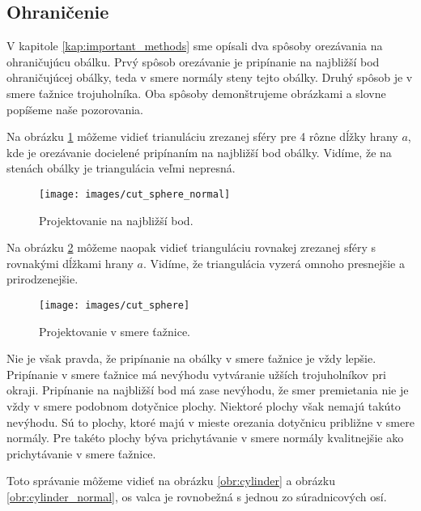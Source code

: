 \newpage

\subsection{Ohraničenie}

V kapitole \ref{kap:important_methods} sme opísali dva spôsoby orezávania na ohraničujúcu obálku.
Prvý spôsob orezávanie je pripínanie na najbližší bod ohraničujúcej obálky, teda v smere normály 
steny tejto obálky. Druhý spôsob je v smere ťažnice trojuholníka. Oba spôsoby demonštrujeme obrázkami
a slovne popíšeme naše pozorovania.

Na obrázku \ref{obr:cut_sphere_normal} môžeme vidieť trianuláciu zrezanej sféry pre 4 rôzne dĺžky 
hrany $a$, kde je orezávanie docielené pripínaním na najbližší bod obálky. Vidíme, že na stenách obálky 
je triangulácia veľmi nepresná.

\begin{figure}
    \centerline{\texttt{[image: images/cut\_sphere\_normal]}}
    \caption[Projektovanie na najbližší bod]{Projektovanie na najbližší bod.}
    \label{obr:cut_sphere_normal}
\end{figure}

Na obrázku \ref{obr:cut_sphere} môžeme naopak vidieť trianguláciu rovnakej zrezanej sféry s rovnakými 
dĺžkami hrany $a$.
Vidíme, že triangulácia vyzerá omnoho presnejšie a prirodzenejšie.

\begin{figure}
    \centerline{\texttt{[image: images/cut\_sphere]}}
    \caption[Projektovanie v smere ťažnice]{Projektovanie v smere ťažnice.}
    \label{obr:cut_sphere}
\end{figure}

Nie je však pravda, že pripínanie na obálky v smere ťažnice je vždy lepšie.
Pripínanie v smere ťažnice má nevýhodu vytváranie užších trojuholníkov pri 
okraji. Pripínanie na najbližší bod má zase nevýhodu, že smer premietania
nie je vždy v smere podobnom dotyčnice plochy.
Niektoré plochy však nemajú takúto nevýhodu.
Sú to plochy, ktoré majú v mieste orezania dotyčnicu približne v smere normály.
Pre takéto plochy býva prichytávanie v smere normály kvalitnejšie ako 
prichytávanie v smere ťažnice.

Toto správanie môžeme vidieť na obrázku \ref{obr:cylinder} a obrázku \ref{obr:cylinder_normal}, 
os valca je rovnobežná s jednou zo súradnicových osí.

